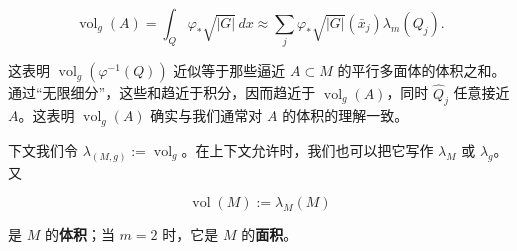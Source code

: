 \[
\operatorname{vol}_g(A) = \int_Q \varphi_*\sqrt{|G|} \, dx \approx \sum_j \varphi_*\sqrt{|G|}(\bar x_j)\lambda_m(Q_j) .
\]

这表明 $ \operatorname{vol}_g(\varphi^{-1}(Q)) $ 近似等于那些逼近 $ A \subset M $ 的平行多面体的体积之和。通过“无限细分”，这些和趋近于积分，因而趋近于 $ \operatorname{vol}_g(A) $，同时 $ \widehat{Q}_j $ 任意接近 $ A $。这表明 $ \operatorname{vol}_g(A) $ 确实与我们通常对 $ A $ 的体积的理解一致。

下文我们令 $ \lambda_{(M,g)} := \operatorname{vol}_g $。在上下文允许时，我们也可以把它写作 $ \lambda_M $ 或 $ \lambda_g $。又

\[
\operatorname{vol}(M) := \lambda_M(M)
\]

是 $ M $ 的\textbf{体积}；当 $ m = 2 $ 时，它是 $ M $ 的\textbf{面积}。

